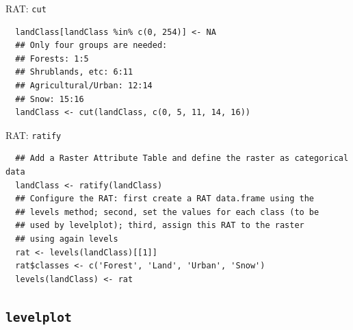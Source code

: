 \documentclass[xcolor={usenames,svgnames,dvipsnames}]{beamer}
\begin{document}
\begin{frame}[fragile,label=sec-3-1-2]{RAT: \texttt{cut}}
 \lstset{language=R,label= ,caption= ,numbers=none}
\begin{lstlisting}
  landClass[landClass %in% c(0, 254)] <- NA
  ## Only four groups are needed:
  ## Forests: 1:5
  ## Shrublands, etc: 6:11
  ## Agricultural/Urban: 12:14
  ## Snow: 15:16
  landClass <- cut(landClass, c(0, 5, 11, 14, 16))
\end{lstlisting}
\end{frame}


\begin{frame}[fragile,label=sec-3-1-3]{RAT: \texttt{ratify}}
 \lstset{language=R,label= ,caption= ,numbers=none}
\begin{lstlisting}
  ## Add a Raster Attribute Table and define the raster as categorical data
  landClass <- ratify(landClass)
  ## Configure the RAT: first create a RAT data.frame using the
  ## levels method; second, set the values for each class (to be
  ## used by levelplot); third, assign this RAT to the raster
  ## using again levels
  rat <- levels(landClass)[[1]]
  rat$classes <- c('Forest', 'Land', 'Urban', 'Snow')
  levels(landClass) <- rat
\end{lstlisting}
\end{frame}


\subsection{\texttt{levelplot}}
\label{sec-3-2}
\end{document}
